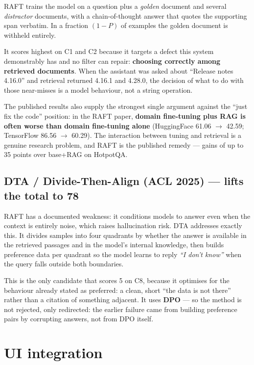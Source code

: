 \documentclass[11pt,a4paper]{article}
\begin{document}
RAFT trains the model on a question plus a \emph{golden} document and several \emph{distractor}
documents, with a chain-of-thought answer that quotes the supporting span verbatim. In a fraction
$(1-P)$ of examples the golden document is withheld entirely.

It scores highest on C1 and C2 because it targets a defect this system demonstrably has and no
filter can repair: \textbf{choosing correctly among retrieved documents}. When the assistant was
asked about ``Release notes 4.16.0'' and retrieval returned 4.16.1 and 4.28.0, the decision of what
to do with those near-misses is a model behaviour, not a string operation.

The published results also supply the strongest single argument against the ``just fix the code''
position: in the RAFT paper, \textbf{domain fine-tuning plus RAG is often worse than domain
fine-tuning alone} (HuggingFace 61.06 $\rightarrow$ 42.59; TensorFlow 86.56 $\rightarrow$ 60.29).
The interaction between tuning and retrieval is a genuine research problem, and RAFT is the
published remedy --- gains of up to 35 points over base+RAG on HotpotQA.

\subsection*{DTA / Divide-Then-Align (ACL 2025) --- lifts the total to 78}

RAFT has a documented weakness: it conditions models to answer even when the context is entirely
noise, which raises hallucination risk. DTA addresses exactly this. It divides samples into four
quadrants by whether the answer is available in the retrieved passages and in the model's internal
knowledge, then builds preference data per quadrant so the model learns to reply
\emph{``I don't know''} when the query falls outside both boundaries.

This is the only candidate that scores 5 on C8, because it optimises for the behaviour already
stated as preferred: a clean, short ``the data is not there'' rather than a citation of something
adjacent. It uses \textbf{DPO} --- so the method is not rejected, only redirected: the earlier
failure came from building preference pairs by corrupting answers, not from DPO itself.

\section{UI integration}
\end{document}
